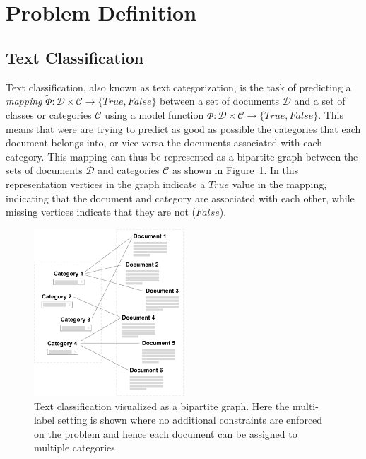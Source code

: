 
\clearpage

\section{Problem Definition}
\label{sec:Problem Definition}

\subsection{Text Classification}
\label{subs:Text Classification}

Text classification, also known as text categorization, is the task of predicting a \emph{mapping} $\widetilde{\Phi} : \mathcal{D} \times \mathcal{C} \rightarrow \{True, False\}$ between a set of documents $\mathcal{D}$ and a set of classes or categories $\mathcal{C}$ using a model function $\Phi : \mathcal{D} \times \mathcal{C} \rightarrow \{True, False\}$. This means that were are trying to predict as good as possible the categories that each document belongs into, or vice versa the documents associated with each category. This mapping can thus be represented as a bipartite graph between the sets of documents $\mathcal{D}$ and categories $\mathcal{C}$ as shown in Figure~\ref{fig:bipartite-graph-text-classification}. In this representation vertices in the graph indicate a $True$ value in the mapping, indicating that the document and category are associated with each other, while missing vertices indicate that they are not ($False$).


\begin{figure}
  \begin{center}
    \includegraphics[width=0.5\textwidth]{img/bipartite-graph-text-classification}
  \end{center}
  \caption{Text classification visualized as a bipartite graph. Here the multi-label setting is shown where no additional constraints are enforced on the problem and hence each document can be assigned to multiple categories}
\label{fig:bipartite-graph-text-classification}
\end{figure}

